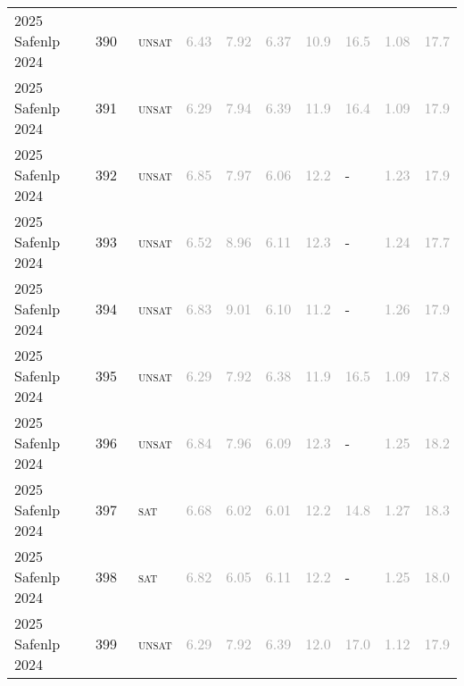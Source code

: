 \begin{center}
{\begin{longtable}{@{}llllllllll@{}}
2025 Safenlp 2024 & 390 & ~\textsc{unsat} & \textcolor{darkgray}{6.43} & \textcolor{darkgray}{7.92} & \textcolor{darkgray}{6.37} & \textcolor{darkgray}{10.9} & \textcolor{darkgray}{16.5} & \textcolor{darkgray}{1.08} & \textcolor{darkgray}{17.7} \\
2025 Safenlp 2024 & 391 & ~\textsc{unsat} & \textcolor{darkgray}{6.29} & \textcolor{darkgray}{7.94} & \textcolor{darkgray}{6.39} & \textcolor{darkgray}{11.9} & \textcolor{darkgray}{16.4} & \textcolor{darkgray}{1.09} & \textcolor{darkgray}{17.9} \\
2025 Safenlp 2024 & 392 & ~\textsc{unsat} & \textcolor{darkgray}{6.85} & \textcolor{darkgray}{7.97} & \textcolor{darkgray}{6.06} & \textcolor{darkgray}{12.2} & - & \textcolor{darkgray}{1.23} & \textcolor{darkgray}{17.9} \\
2025 Safenlp 2024 & 393 & ~\textsc{unsat} & \textcolor{darkgray}{6.52} & \textcolor{darkgray}{8.96} & \textcolor{darkgray}{6.11} & \textcolor{darkgray}{12.3} & - & \textcolor{darkgray}{1.24} & \textcolor{darkgray}{17.7} \\
2025 Safenlp 2024 & 394 & ~\textsc{unsat} & \textcolor{darkgray}{6.83} & \textcolor{darkgray}{9.01} & \textcolor{darkgray}{6.10} & \textcolor{darkgray}{11.2} & - & \textcolor{darkgray}{1.26} & \textcolor{darkgray}{17.9} \\
2025 Safenlp 2024 & 395 & ~\textsc{unsat} & \textcolor{darkgray}{6.29} & \textcolor{darkgray}{7.92} & \textcolor{darkgray}{6.38} & \textcolor{darkgray}{11.9} & \textcolor{darkgray}{16.5} & \textcolor{darkgray}{1.09} & \textcolor{darkgray}{17.8} \\
2025 Safenlp 2024 & 396 & ~\textsc{unsat} & \textcolor{darkgray}{6.84} & \textcolor{darkgray}{7.96} & \textcolor{darkgray}{6.09} & \textcolor{darkgray}{12.3} & - & \textcolor{darkgray}{1.25} & \textcolor{darkgray}{18.2} \\
2025 Safenlp 2024 & 397 & ~\textsc{sat} & \textcolor{darkgray}{6.68} & \textcolor{darkgray}{6.02} & \textcolor{darkgray}{6.01} & \textcolor{darkgray}{12.2} & \textcolor{darkgray}{14.8} & \textcolor{darkgray}{1.27} & \textcolor{darkgray}{18.3} \\
2025 Safenlp 2024 & 398 & ~\textsc{sat} & \textcolor{darkgray}{6.82} & \textcolor{darkgray}{6.05} & \textcolor{darkgray}{6.11} & \textcolor{darkgray}{12.2} & - & \textcolor{darkgray}{1.25} & \textcolor{darkgray}{18.0} \\
2025 Safenlp 2024 & 399 & ~\textsc{unsat} & \textcolor{darkgray}{6.29} & \textcolor{darkgray}{7.92} & \textcolor{darkgray}{6.39} & \textcolor{darkgray}{12.0} & \textcolor{darkgray}{17.0} & \textcolor{darkgray}{1.12} & \textcolor{darkgray}{17.9} \\

\end{longtable}}
\end{center}
